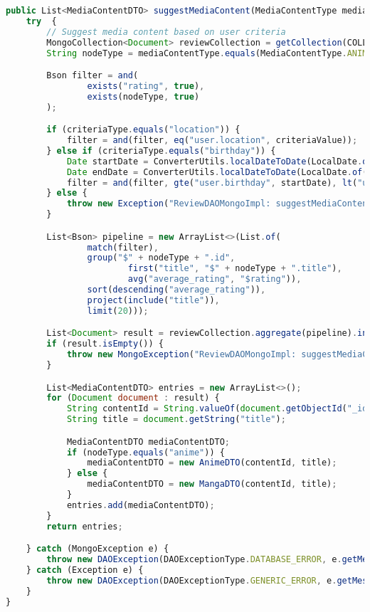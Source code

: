 \begin{lstlisting}[language=JavaScript]
public List<MediaContentDTO> suggestMediaContent(MediaContentType mediaContentType, String criteriaType, String criteriaValue) throws DAOException {
    try  {
        // Suggest media content based on user criteria
        MongoCollection<Document> reviewCollection = getCollection(COLLECTION_NAME);
        String nodeType = mediaContentType.equals(MediaContentType.ANIME) ? "anime" : "manga";

        Bson filter = and(
                exists("rating", true),
                exists(nodeType, true)
        );

        if (criteriaType.equals("location")) {
            filter = and(filter, eq("user.location", criteriaValue));
        } else if (criteriaType.equals("birthday")) {
            Date startDate = ConverterUtils.localDateToDate(LocalDate.of(Integer.parseInt(criteriaValue), 1, 1));
            Date endDate = ConverterUtils.localDateToDate(LocalDate.of(Integer.parseInt(criteriaValue) + 1, 1, 1));
            filter = and(filter, gte("user.birthday", startDate), lt("user.birthday", endDate));
        } else {
            throw new Exception("ReviewDAOMongoImpl: suggestMediaContent: Invalid criteria type");
        }

        List<Bson> pipeline = new ArrayList<>(List.of(
                match(filter),
                group("$" + nodeType + ".id",
                        first("title", "$" + nodeType + ".title"),
                        avg("average_rating", "$rating")),
                sort(descending("average_rating")),
                project(include("title")),
                limit(20)));

        List<Document> result = reviewCollection.aggregate(pipeline).into(new ArrayList<>());
        if (result.isEmpty()) {
            throw new MongoException("ReviewDAOMongoImpl: suggestMediaContent: No reviews found");
        }

        List<MediaContentDTO> entries = new ArrayList<>();
        for (Document document : result) {
            String contentId = String.valueOf(document.getObjectId("_id"));
            String title = document.getString("title");

            MediaContentDTO mediaContentDTO;
            if (nodeType.equals("anime")) {
                mediaContentDTO = new AnimeDTO(contentId, title);
            } else {
                mediaContentDTO = new MangaDTO(contentId, title);
            }
            entries.add(mediaContentDTO);
        }
        return entries;

    } catch (MongoException e) {
        throw new DAOException(DAOExceptionType.DATABASE_ERROR, e.getMessage());
    } catch (Exception e) {
        throw new DAOException(DAOExceptionType.GENERIC_ERROR, e.getMessage());
    }
}
\end{lstlisting}
